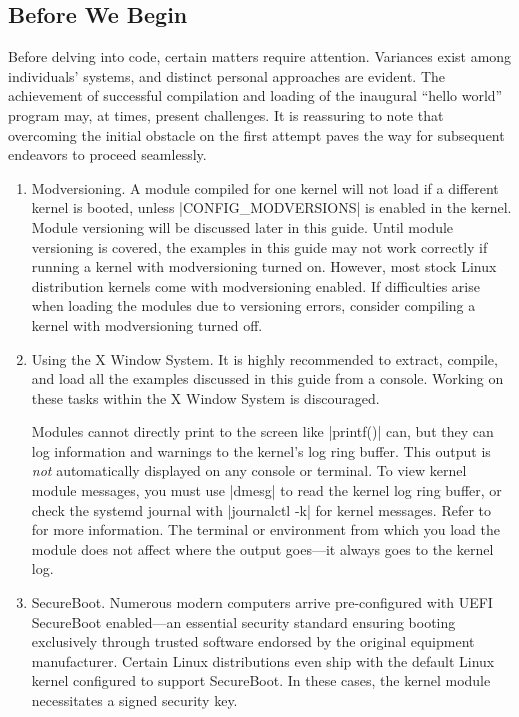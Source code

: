\documentclass[10pt, oneside]{book}
\begin{document}
\subsection{Before We Begin}
\label{sec:preparation}
Before delving into code, certain matters require attention.
Variances exist among individuals' systems, and distinct personal approaches are evident.
The achievement of successful compilation and loading of the inaugural ``hello world'' program may,
at times, present challenges.
It is reassuring to note that overcoming the initial obstacle on the first attempt paves the way for subsequent endeavors to proceed seamlessly.

\begin{enumerate}
  \item Modversioning.
        A module compiled for one kernel will not load if a different kernel is booted,
        unless \cpp|CONFIG_MODVERSIONS| is enabled in the kernel.
        Module versioning will be discussed later in this guide.
        Until module versioning is covered, the examples in this guide may not work correctly if running a kernel with modversioning turned on.
        However, most stock Linux distribution kernels come with modversioning enabled.
        If difficulties arise when loading the modules due to versioning errors, consider compiling a kernel with modversioning turned off.

  \item Using the X Window System.
        It is highly recommended to extract, compile, and load all the examples discussed in this guide from a console.
        Working on these tasks within the X Window System is discouraged.

        Modules cannot directly print to the screen like \cpp|printf()| can,
        but they can log information and warnings to the kernel's log ring buffer.
        This output is \emph{not} automatically displayed on any console or terminal.
        To view kernel module messages, you must use \sh|dmesg| to read the kernel log ring buffer,
        or check the systemd journal with \sh|journalctl -k| for kernel messages.
        Refer to  for more information.
        The terminal or environment from which you load the module does not affect where the output goes—it always goes to the kernel log.
  \item SecureBoot.
        Numerous modern computers arrive pre-configured with UEFI SecureBoot enabled—an essential security standard ensuring booting exclusively through trusted software endorsed by the original equipment manufacturer.
        Certain Linux distributions even ship with the default Linux kernel configured to support SecureBoot.
        In these cases, the kernel module necessitates a signed security key.


\end{enumerate}
\end{document}
